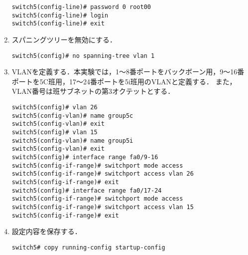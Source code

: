 \begin{enumerate}
\begin{lstlisting}
switch5(config-line)# password 0 root00
switch5(config-line)# login
switch5(config-line)# exit
\end{lstlisting}
    \item スパニングツリーを無効にする．
          \begin{lstlisting}
switch5(config)# no spanning-tree vlan 1
    \end{lstlisting}
    \item VLANを定義する．本実験では，1〜8番ポートをバックボーン用，9〜16番ポートを5C班用，17〜24番ポートを5i班用のVLANと定義する．
          また，VLAN番号は班サブネットの第3オクテットとする．
          \begin{lstlisting}
switch5(config)# vlan 26
switch5(config-vlan)# name group5c
switch5(config-vlan)# exit
switch5(config)# vlan 15
switch5(config-vlan)# name group5i
switch5(config-vlan)# exit
switch5(config)# interface range fa0/9-16
switch5(config-if-range)# switchport mode access
switch5(config-if-range)# switchport access vlan 26
switch5(config-if-range)# exit
switch5(config)# interface range fa0/17-24
switch5(config-if-range)# switchport mode access
switch5(config-if-range)# switchport access vlan 15
switch5(config-if-range)# exit
\end{lstlisting}
    \item 設定内容を保存する．
          \begin{lstlisting}
switch5# copy running-config startup-config
\end{lstlisting}
\end{enumerate}

